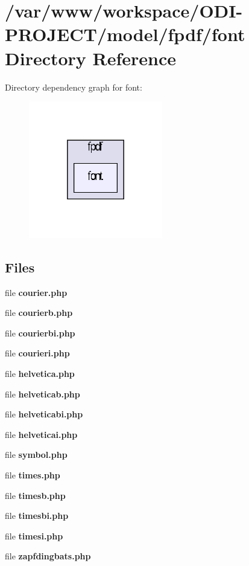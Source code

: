 \section{/var/www/workspace/\+O\+D\+I-\/\+P\+R\+O\+J\+E\+C\+T/model/fpdf/font Directory Reference}
\label{dir_cfc67e0c2b9055f9db43677bf24a6579}
Directory dependency graph for font\+:\nopagebreak
\begin{figure}[H]
\begin{center}
\leavevmode
\includegraphics[width=166pt]{dir_cfc67e0c2b9055f9db43677bf24a6579_dep}
\end{center}
\end{figure}
\subsection*{Files}
\begin{DoxyCompactItemize}
\item 
file {\bfseries courier.\+php}
\item 
file {\bfseries courierb.\+php}
\item 
file {\bfseries courierbi.\+php}
\item 
file {\bfseries courieri.\+php}
\item 
file {\bfseries helvetica.\+php}
\item 
file {\bfseries helveticab.\+php}
\item 
file {\bfseries helveticabi.\+php}
\item 
file {\bfseries helveticai.\+php}
\item 
file {\bfseries symbol.\+php}
\item 
file {\bfseries times.\+php}
\item 
file {\bfseries timesb.\+php}
\item 
file {\bfseries timesbi.\+php}
\item 
file {\bfseries timesi.\+php}
\item 
file {\bfseries zapfdingbats.\+php}
\end{DoxyCompactItemize}

